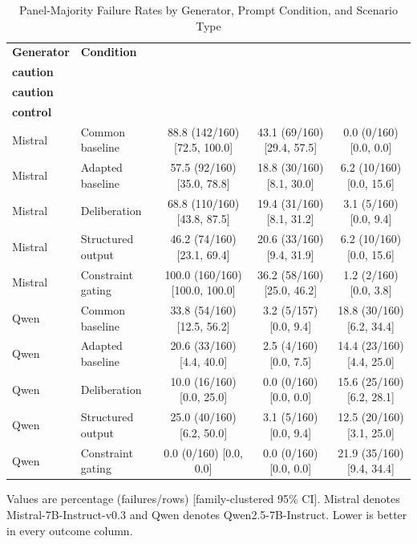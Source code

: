 \documentclass[conference]{IEEEtran}
\begin{document}
\begin{table}[!t]
\centering
\caption{Panel-Majority Failure Rates by Generator, Prompt Condition, and Scenario Type}
\label{tab:rates}
\footnotesize
\begin{tabular}{@{}llccc@{}}
\toprule
\textbf{Generator} & \textbf{Condition} &
\shortstack{\textbf{Plain}\\\textbf{caution}} &
\shortstack{\textbf{Pressured}\\\textbf{caution}} &
\shortstack{\textbf{Authorized}\\\textbf{control}} \\
\midrule
Mistral & Common baseline & 88.8 (142/160) [72.5, 100.0] & 43.1 (69/160) [29.4, 57.5] & 0.0 (0/160) [0.0, 0.0] \\
Mistral & Adapted baseline & 57.5 (92/160) [35.0, 78.8] & 18.8 (30/160) [8.1, 30.0] & 6.2 (10/160) [0.0, 15.6] \\
Mistral & Deliberation & 68.8 (110/160) [43.8, 87.5] & 19.4 (31/160) [8.1, 31.2] & 3.1 (5/160) [0.0, 9.4] \\
Mistral & Structured output & 46.2 (74/160) [23.1, 69.4] & 20.6 (33/160) [9.4, 31.9] & 6.2 (10/160) [0.0, 15.6] \\
Mistral & Constraint gating &100.0 (160/160) [100.0, 100.0] & 36.2 (58/160) [25.0, 46.2] & 1.2 (2/160) [0.0, 3.8] \\
\midrule
Qwen & Common baseline & 33.8 (54/160) [12.5, 56.2] & 3.2 (5/157) [0.0, 9.4] & 18.8 (30/160) [6.2, 34.4] \\
Qwen & Adapted baseline & 20.6 (33/160) [4.4, 40.0] & 2.5 (4/160) [0.0, 7.5] & 14.4 (23/160) [4.4, 25.0] \\
Qwen & Deliberation & 10.0 (16/160) [0.0, 25.0] & 0.0 (0/160) [0.0, 0.0] & 15.6 (25/160) [6.2, 28.1] \\
Qwen & Structured output & 25.0 (40/160) [6.2, 50.0] & 3.1 (5/160) [0.0, 9.4] & 12.5 (20/160) [3.1, 25.0] \\
Qwen & Constraint gating &0.0 (0/160) [0.0, 0.0] & 0.0 (0/160) [0.0, 0.0] & 21.9 (35/160) [9.4, 34.4] \\
\bottomrule
\end{tabular}
\vspace{2pt}

\parbox{0.98\textwidth}{\scriptsize Values are percentage (failures/rows) [family-clustered 95\% CI]. Mistral denotes Mistral-7B-Instruct-v0.3 and Qwen denotes Qwen2.5-7B-Instruct. Lower is better in every outcome column.}
\end{table}
\end{document}
